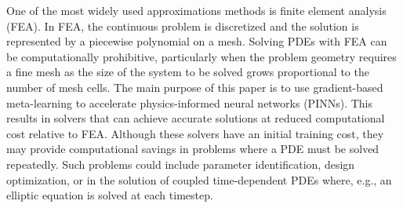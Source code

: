 One of the most widely used approximations methods is finite element analysis (FEA).
In FEA, the continuous problem is discretized and the solution is represented by a piecewise polynomial on a mesh.
Solving PDEs with FEA can be computationally prohibitive, particularly when the problem geometry requires a fine mesh as the size of the system to be solved grows proportional to the number of mesh cells.
The main purpose of this paper is to use gradient-based meta-learning to accelerate physics-informed neural networks (PINNs).
This results in solvers that can achieve accurate solutions at reduced computational cost relative to FEA.
Although these solvers have an initial training cost, they may provide computational savings in problems where a PDE must be solved repeatedly.
Such problems could include parameter identification, design optimization, or in the solution of coupled time-dependent PDEs where, e.g., an elliptic equation is solved at each timestep.



